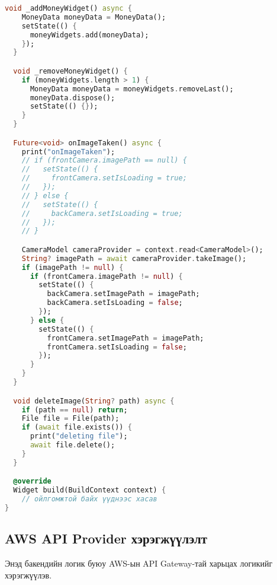 \begin{lstlisting}[language=Dart, caption=Дата цуглуулалтын логик хэрэгжүүлэлт, frame=single]
  void _addMoneyWidget() async {
    MoneyData moneyData = MoneyData();
    setState(() {
      moneyWidgets.add(moneyData);
    });
  }

  void _removeMoneyWidget() {
    if (moneyWidgets.length > 1) {
      MoneyData moneyData = moneyWidgets.removeLast();
      moneyData.dispose();
      setState(() {});
    }
  }

  Future<void> onImageTaken() async {
    print("onImageTaken");
    // if (frontCamera.imagePath == null) {
    //   setState(() {
    //     frontCamera.setIsLoading = true;
    //   });
    // } else {
    //   setState(() {
    //     backCamera.setIsLoading = true;
    //   });
    // }

    CameraModel cameraProvider = context.read<CameraModel>();
    String? imagePath = await cameraProvider.takeImage();
    if (imagePath != null) {
      if (frontCamera.imagePath != null) {
        setState(() {
          backCamera.setImagePath = imagePath;
          backCamera.setIsLoading = false;
        });
      } else {
        setState(() {
          frontCamera.setImagePath = imagePath;
          frontCamera.setIsLoading = false;
        });
      }
    }
  }

  void deleteImage(String? path) async {
    if (path == null) return;
    File file = File(path);
    if (await file.exists()) {
      print("deleting file");
      await file.delete();
    }
  }

  @override
  Widget build(BuildContext context) {
    // ойлгомжтой байх үүднээс хасав
}
\end{lstlisting}

\subsection{AWS API Provider хэрэгжүүлэлт}

Энэд бакендийн логик буюу AWS-ын API Gateway-тай харьцах логикийг хэрэгжүүлэв.


